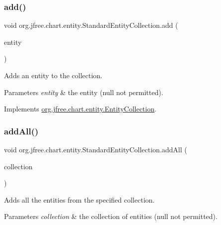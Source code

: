\subsubsection{\texorpdfstring{add()}{add()}}
{\footnotesize\ttfamily void org.\+jfree.\+chart.\+entity.\+Standard\+Entity\+Collection.\+add (\begin{DoxyParamCaption}\item[{\mbox{\hyperlink{classorg_1_1jfree_1_1chart_1_1entity_1_1_chart_entity}{Chart\+Entity}}}]{entity }\end{DoxyParamCaption})}

Adds an entity to the collection.


\begin{DoxyParams}{Parameters}
{\em entity} & the entity ({\ttfamily null} not permitted). \\
\hline
\end{DoxyParams}


Implements \mbox{\hyperlink{interfaceorg_1_1jfree_1_1chart_1_1entity_1_1_entity_collection_adf370a130e27fabdb6785a82982f245b}{org.\+jfree.\+chart.\+entity.\+Entity\+Collection}}.

\mbox{\label{classorg_1_1jfree_1_1chart_1_1entity_1_1_standard_entity_collection_a82dc76894c237d1d31870aacb148f023}} 
\subsubsection{\texorpdfstring{add\+All()}{addAll()}}
{\footnotesize\ttfamily void org.\+jfree.\+chart.\+entity.\+Standard\+Entity\+Collection.\+add\+All (\begin{DoxyParamCaption}\item[{\mbox{\hyperlink{interfaceorg_1_1jfree_1_1chart_1_1entity_1_1_entity_collection}{Entity\+Collection}}}]{collection }\end{DoxyParamCaption})}

Adds all the entities from the specified collection.


\begin{DoxyParams}{Parameters}
{\em collection} & the collection of entities ({\ttfamily null} not permitted). \\
\hline
\end{DoxyParams}


